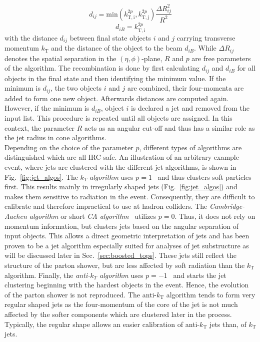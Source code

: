 \begin{description}
\begin{equation*}
d_{ij} = \mathrm{min}(k_\mathrm{T,i}^{2p}, k_\mathrm{T,j}^{2p}) \frac{\Delta R_{ij}^2}{R^2}
\end{equation*}
\begin{equation*}
d_{iB} = k_\mathrm{T,i}^{2p}
\end{equation*}
with the distance $d_{ij}$ between final state objects $i$ and $j$ carrying transverse momentum $k_\mathrm{T}$ and the distance of the object to the beam $d_{iB}$. While $\Delta R_{ij}$ denotes the spatial separation in the $(\eta, \phi)$-plane, $R$ and $p$ are free parameters of the algorithm. The recombination is done by first calculating $d_{ij}$ and $d_{iB}$ for all objects in the final state and then identifying the minimum value. If the minimum is $d_{ij}$, the two objects $i$ and $j$ are combined, \ie their four-momenta are added to form one new object. Afterwards distances are computed again. However, if the minimum is $d_{iB}$, object $i$ is declared a jet and removed from the input list. This procedure is repeated until all objects are assigned. In this context, the parameter $R$ acts as an angular cut-off and thus has a similar role as the jet radius in cone algorithms. \\
Depending on the choice of the parameter $p$, different types of algorithms are distinguished which are all IRC safe. An illustration of an arbitrary example event, where jets are clustered with the different jet algorithms, is shown in Fig.~\ref{fig:jet_algos}. The $k_T$ \textit{algorithm} uses $p = 1$~\cite{PhysRevD.48.3160} and thus clusters soft particles first. This results mainly in irregularly shaped jets (\cf Fig.~\ref{fig:jet_algos}) and makes them sensitive to radiation in the event. Consequently, they are difficult to calibrate and therefore impractical to use at hadron colliders. The \textit{Cambridge-Aachen algorithm} or short \textit{CA algorithm}~\cite{Dokshitzer:1997in, Wobisch:1998wt} utilizes $p = 0$. Thus, it does not rely on momentum information, but clusters jets based on the angular separation of input objects. This allows a direct geometric interpretation of jets and has been proven to be a jet algorithm especially suited for analyses of jet substructure as will be discussed later in Sec.~\ref{sec:boosted_tops}. These jets still reflect the structure of the parton shower, but are less affected by soft radiation than the $k_\mathrm{T}$ algorithm. Finally, the \textit{anti-$k_T$ algorithm} uses $p = -1$~\cite{1126-6708-2008-04-063} and starts the jet clustering beginning with the hardest objects in the event. Hence, the evolution of the parton shower is not reproduced. The anti-$k_\mathrm{T}$ algorithm tends to form very regular shaped jets as the four-momentum of the core of the jet is not much affected by the softer components which are clustered later in the process. Typically, the regular shape allows an easier calibration of anti-$k_\mathrm{T}$ jets than, \eg of $k_\mathrm{T}$ jets. 
\end{description}

